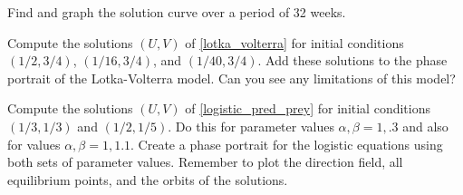 Find and graph the solution curve over a period of 32 weeks.

Compute the solutions $(U,V)$ of \eqref{lotka_volterra} 
for initial conditions $(1/2, 3/4)$, $(1/16, 3/4)$, and $(1/40, 3/4)$.
Add these solutions to the phase portrait of the Lotka-Volterra model.
Can you see any limitations of this model?

Compute the solutions $(U,V)$ of \eqref{logistic_pred_prey}
for initial conditions $(1/3, 1/3)$ and $(1/2, 1/5)$.
Do this for parameter values $\alpha, \beta = 1, .3$ and also for values $\alpha, \beta = 1, 1.1$.
Create a phase portrait for the logistic equations using both sets of parameter values.
Remember to plot the direction field, all equilibrium points, and the orbits of the solutions.
